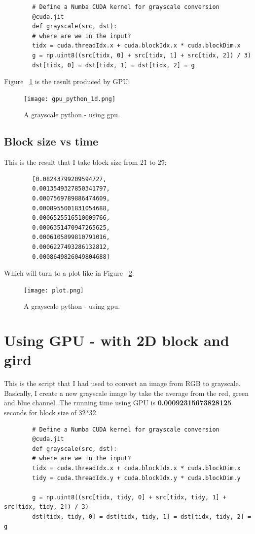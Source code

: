 \documentclass{article}
\begin{document}
	\begin{verbatim}
		# Define a Numba CUDA kernel for grayscale conversion
		@cuda.jit
		def grayscale(src, dst):
		# where are we in the input?
		tidx = cuda.threadIdx.x + cuda.blockIdx.x * cuda.blockDim.x
		g = np.uint8((src[tidx, 0] + src[tidx, 1] + src[tidx, 2]) / 3)
		dst[tidx, 0] = dst[tidx, 1] = dst[tidx, 2] = g
	\end{verbatim}
	
	Figure ~\ref{fig:gpu_python} is the result produced by GPU:
	
	\begin{figure}
		\texttt{[image: gpu\_python\_1d.png]}
		\caption{A grayscale python - using gpu.}
		\label{fig:gpu_python}
	\end{figure}
	
	\subsection{Block size vs time}
	This is the result that I take block size from 2\^1 to 2\^9:
	\begin{verbatim}
		[0.08243799209594727,
		0.0013549327850341797,
		0.0007569789886474609,
		0.0008955001831054688,
		0.0006525516510009766,
		0.0006351470947265625,
		0.0006105899810791016,
		0.0006227493286132812,
		0.0008649826049804688]
	\end{verbatim}
	Which will turn to a plot like in Figure ~\ref{fig:plot}:
	\begin{figure}
		\texttt{[image: plot.png]}
		\caption{A grayscale python - using gpu.}
		\label{fig:plot}
	\end{figure}
	
	\section{Using GPU - with 2D block and gird}
	This is the script that I had used to convert an image from RGB to grayscale. Basically, I create a new grayscale image by take the average from the red, green and blue channel. The running time using GPU is \textbf{0.00092315673828125} seconds for block size of 32*32.
	\begin{verbatim}
		# Define a Numba CUDA kernel for grayscale conversion
		@cuda.jit
		def grayscale(src, dst):
		# where are we in the input?
		tidx = cuda.threadIdx.x + cuda.blockIdx.x * cuda.blockDim.x
		tidy = cuda.threadIdx.y + cuda.blockIdx.y * cuda.blockDim.y
		
		g = np.uint8((src[tidx, tidy, 0] + src[tidx, tidy, 1] + src[tidx, tidy, 2]) / 3)
		dst[tidx, tidy, 0] = dst[tidx, tidy, 1] = dst[tidx, tidy, 2] = g
	\end{verbatim}
	
\end{document}

